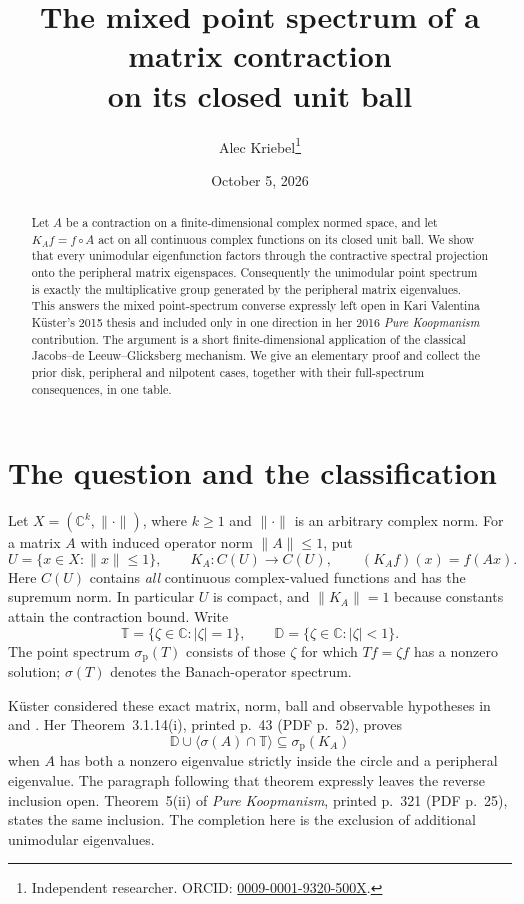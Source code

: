 \documentclass[11pt]{article}
\title{The mixed point spectrum of a matrix contraction\\
on its closed unit ball}
\author{Alec Kriebel\thanks{Independent researcher.
ORCID: \href{https://orcid.org/0009-0001-9320-500X}{0009-0001-9320-500X}.}}
\date{October 5, 2026}
\newcommand{\C}{\mathbb C}
\newcommand{\T}{\mathbb T}
\newcommand{\D}{\mathbb D}
\newcommand{\spoint}{\sigma_{\mathrm p}}
\begin{document}
\maketitle

\begin{abstract}
Let \(A\) be a contraction on a finite-dimensional complex normed space,
and let \(K_A f=f\circ A\) act on all continuous complex functions on its
closed unit ball. We show that every unimodular eigenfunction factors
through the contractive spectral projection onto the peripheral matrix
eigenspaces. Consequently the unimodular point spectrum is exactly the
multiplicative group generated by the peripheral matrix eigenvalues.
This answers the mixed point-spectrum converse expressly left open in
Kari Valentina K\"uster's 2015 thesis and included only in one direction
in her 2016 \emph{Pure Koopmanism} contribution. The argument is a short
finite-dimensional application of the classical Jacobs--de Leeuw--Glicksberg
mechanism. We give an elementary proof and collect the prior disk,
peripheral and nilpotent cases, together with their full-spectrum
consequences, in one table.
\end{abstract}

\section{The question and the classification}

Let \(X=(\C^k,\|\cdot\|)\), where \(k\geq1\) and \(\|\cdot\|\) is an
arbitrary complex norm. For a matrix \(A\) with induced operator norm
\(\|A\|\leq1\), put
\[
 U=\{x\in X:\|x\|\leq1\},\qquad
 K_A:C(U)\longrightarrow C(U),\qquad (K_Af)(x)=f(Ax).
\]
Here \(C(U)\) contains \emph{all} continuous complex-valued functions and
has the supremum norm. In particular \(U\) is compact, and \(\|K_A\|=1\)
because constants attain the contraction bound. Write
\[
 \T=\{\zeta\in\C:|\zeta|=1\},\qquad
 \D=\{\zeta\in\C:|\zeta|<1\}.
\]
The point spectrum \(\spoint(T)\) consists of those \(\zeta\) for which
\(Tf=\zeta f\) has a nonzero solution; \(\sigma(T)\) denotes the
Banach-operator spectrum.

K\"uster considered these exact matrix, norm, ball and observable
hypotheses in \cite[Section~3.1, printed pp.~35--43]{Kuester2015}
and \cite[Example~4, printed p.~321]{Kuester2016}. Her
Theorem~3.1.14(i), printed p.~43 (PDF p.~52), proves
\[
 \D\cup\langle\sigma(A)\cap\T\rangle
       \subseteq\spoint(K_A)
\]
when \(A\) has both a nonzero eigenvalue strictly inside the circle and a
peripheral eigenvalue. The paragraph following that theorem expressly
leaves the reverse inclusion open. Theorem~5(ii) of
\emph{Pure Koopmanism}, printed p.~321 (PDF p.~25), states the same
inclusion. The completion here is the exclusion of additional
unimodular eigenvalues.
\end{document}
